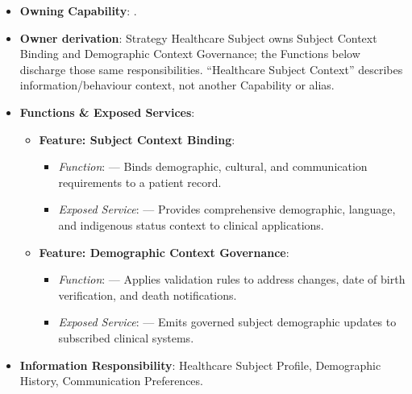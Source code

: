 \begin{itemize}

\item
\textbf{Owning Capability}: \texttt{}.



\item
\textbf{Owner derivation}: Strategy Healthcare Subject owns Subject Context Binding and Demographic Context Governance; the Functions below discharge those same responsibilities. “Healthcare Subject Context” describes information/\allowbreak{}behaviour context, not another Capability or alias.



\item
\textbf{Functions \& Exposed Services}:


\begin{itemize}

\item
\textbf{Feature: Subject Context Binding}:


\begin{itemize}

\item
\emph{Function}: \texttt{} — Binds demographic, cultural, and communication requirements to a patient record.



\item
\emph{Exposed Service}: \texttt{} — Provides comprehensive demographic, language, and indigenous status context to clinical applications.



\end{itemize}


\item
\textbf{Feature: Demographic Context Governance}:


\begin{itemize}

\item
\emph{Function}: \texttt{} — Applies validation rules to address changes, date of birth verification, and death notifications.



\item
\emph{Exposed Service}: \texttt{} — Emits governed subject demographic updates to subscribed clinical systems.



\end{itemize}


\end{itemize}


\item
\textbf{Information Responsibility}: Healthcare Subject Profile, Demographic History, Communication Preferences.



\end{itemize}
\label{rad:em:52}

